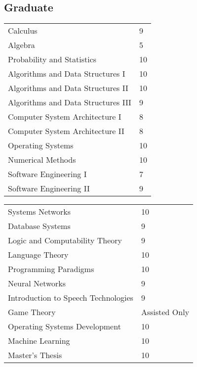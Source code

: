 \subsection{Graduate}
\begin{minipage}[t]{0.48\textwidth}
    \phantom{Hola}

\hspace{1cm}\begin{tabular}{p{} p{}}
Calculus & 9 \\
Algebra & 5 \\
Probability and Statistics & 10 \\
Algorithms and Data Structures I & 10 \\
Algorithms and Data Structures II & 10 \\
Algorithms and Data Structures III & 9 \\
Computer System Architecture I & 8 \\
Computer System Architecture II & 8 \\
Operating Systems & 10 \\
Numerical Methods & 10 \\
Software Engineering I & 7 \\
Software Engineering II & 9 \\
\end{tabular}
\end{minipage}
\begin{minipage}[t]{0.48\textwidth}
    \phantom{Hola}

\begin{tabular}{p{} p{}}
Systems Networks & 10 \\
Database Systems & 9 \\
Logic and Computability Theory & 9 \\
Language Theory & 10 \\
Programming Paradigms & 10 \\
Neural Networks & 9 \\
Introduction to Speech Technologies & 9 \\
Game Theory & Assisted Only \\
Operating Systems Development & 10 \\
Machine Learning & 10 \\
Master's Thesis & 10 \\
\end{tabular}
\end{minipage}

\sectionspace

